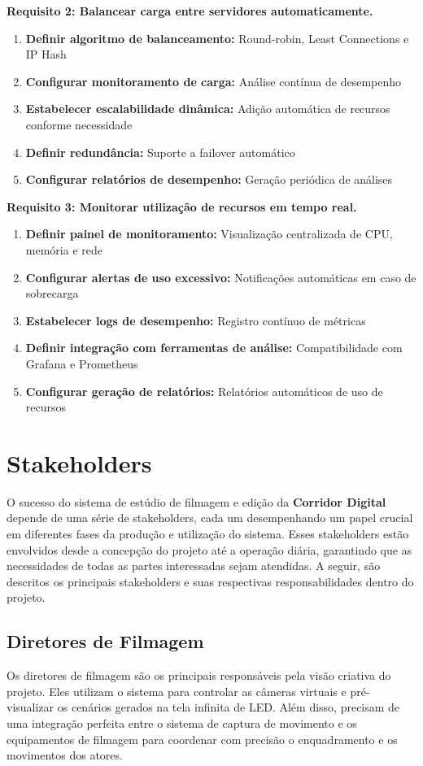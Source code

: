 \textbf{Requisito 2: Balancear carga entre servidores automaticamente.}
\begin{enumerate}[leftmargin=*]
    \item \textbf{Definir algoritmo de balanceamento:} Round-robin, Least Connections e IP Hash
    \item \textbf{Configurar monitoramento de carga:} Análise contínua de desempenho
    \item \textbf{Estabelecer escalabilidade dinâmica:} Adição automática de recursos conforme necessidade
    \item \textbf{Definir redundância:} Suporte a failover automático
    \item \textbf{Configurar relatórios de desempenho:} Geração periódica de análises
\end{enumerate}

\textbf{Requisito 3: Monitorar utilização de recursos em tempo real.}
\begin{enumerate}[leftmargin=*]
    \item \textbf{Definir painel de monitoramento:} Visualização centralizada de CPU, memória e rede
    \item \textbf{Configurar alertas de uso excessivo:} Notificações automáticas em caso de sobrecarga
    \item \textbf{Estabelecer logs de desempenho:} Registro contínuo de métricas
    \item \textbf{Definir integração com ferramentas de análise:} Compatibilidade com Grafana e Prometheus
    \item \textbf{Configurar geração de relatórios:} Relatórios automáticos de uso de recursos
\end{enumerate}

\section{Stakeholders}

O sucesso do sistema de estúdio de filmagem e edição da \textbf{Corridor Digital} depende de uma série de stakeholders, cada um desempenhando um papel crucial em diferentes fases da produção e utilização do sistema. Esses stakeholders estão envolvidos desde a concepção do projeto até a operação diária, garantindo que as necessidades de todas as partes interessadas sejam atendidas. A seguir, são descritos os principais stakeholders e suas respectivas responsabilidades dentro do projeto.

\subsection{Diretores de Filmagem}
Os diretores de filmagem são os principais responsáveis pela visão criativa do projeto. Eles utilizam o sistema para controlar as câmeras virtuais e pré-visualizar os cenários gerados na tela infinita de LED. Além disso, precisam de uma integração perfeita entre o sistema de captura de movimento e os equipamentos de filmagem para coordenar com precisão o enquadramento e os movimentos dos atores.

